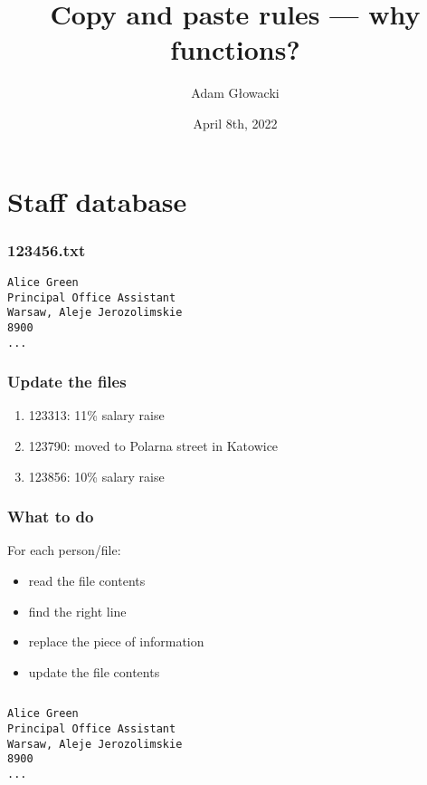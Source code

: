 \documentclass[aspectratio=169]{beamer}
\title{Copy and paste rules --- why functions?}
\author{Adam Głowacki}
\date{April 8th, 2022}
\begin{document}
\begin{frame}
\titlepage
\end{frame}

\section{Staff database}

\begin{frame}[fragile]
\frametitle{123456.txt}
\begin{verbatim}
Alice Green
Principal Office Assistant
Warsaw, Aleje Jerozolimskie
8900
...
\end{verbatim}
\end{frame}

\begin{frame}
\frametitle{Update the files}
\begin{enumerate}
  \item 123313: 11\% salary raise
  \item 123790: moved to Polarna street in Katowice
  \item 123856: 10\% salary raise
\end{enumerate}
\end{frame}

\begin{frame}
\frametitle{What to do}
For each person/file:
\begin{itemize}
  \item read the file contents
  \item find the right line
  \item replace the piece of information
  \item update the file contents
\end{itemize}
\end{frame}

\begin{frame}[fragile]

\end{frame}

\begin{frame}[fragile]
  \begin{columns}
    \begin{column}{0.5\textwidth}
      \begin{verbatim}
Alice Green
Principal Office Assistant
Warsaw, Aleje Jerozolimskie
8900
...
      \end{verbatim}
    \end{column}
    \begin{column}{0.5\textwidth}
      
    \end{column}
  \end{columns}
\end{frame}
\end{document}
